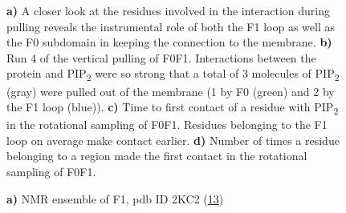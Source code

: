\documentclass[
  twocolumn]{biophys-new-mod}
\begin{document}
\begin{figure}
\begin{minipage}[t]{0.50\linewidth}
{{}

}

\subcaption{\label{fig-f0f1-first-to-find}~}
\end{minipage}%

\caption{\label{fig-suppl-2}\textbf{a)} A closer look at the residues
involved in the interaction during pulling reveals the instrumental role
of both the F1 loop as well as the F0 subdomain in keeping the
connection to the membrane. \textbf{b)} Run 4 of the vertical pulling of
F0F1. Interactions between the protein and PIP\textsubscript{2} were so
strong that a total of 3 molecules of PIP\textsubscript{2} (gray) were
pulled out of the membrane (1 by F0 (green) and 2 by the F1 loop
(blue)). \textbf{c)} Time to first contact of a residue with
PIP\textsubscript{2} in the rotational sampling of F0F1. Residues
belonging to the F1 loop on average make contact earlier. \textbf{d)}
Number of times a residue belonging to a region made the first contact
in the rotational sampling of F0F1.}

\end{figure}

\begin{figure}

\begin{minipage}[t]{0.50\linewidth}

{\centering 


}

\subcaption{\label{fig-nmr-ensemble}~}
\end{minipage}%

\caption{\label{fig-suppl-3}\textbf{a)} NMR ensemble of F1, pdb ID 2KC2
(\protect\hyperlink{ref-goultStructureDoubleUbiquitinlike2010}{13})}

\end{figure}
\end{document}
